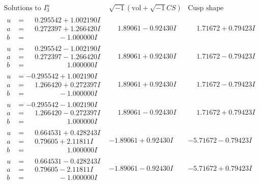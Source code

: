 \documentclass[1p]{elsarticle_modified}
\theoremstyle{definition}
\newcommand{\I}{\sqrt{-1}}
\begin{document}
$$\begin{array}{c|c|c}  
\text{Solutions to }I^u_{3}& \I (\text{vol} + \sqrt{-1}CS) & \text{Cusp shape}\\
 \hline 
\begin{aligned}
u &= \phantom{-}0.295542 + 1.002190 I \\
a &= \phantom{-}0.272397 + 1.266420 I \\
b &= \phantom{-0.000000 } -1.000000 I\end{aligned}
 & \phantom{-}1.89061 - 0.92430 I & \phantom{-}1.71672 + 0.79423 I \\ \hline\begin{aligned}
u &= \phantom{-}0.295542 - 1.002190 I \\
a &= \phantom{-}0.272397 - 1.266420 I \\
b &= \phantom{-0.000000 -}1.000000 I\end{aligned}
 & \phantom{-}1.89061 + 0.92430 I & \phantom{-}1.71672 - 0.79423 I \\ \hline\begin{aligned}
u &= -0.295542 + 1.002190 I \\
a &= \phantom{-}1.266420 + 0.272397 I \\
b &= \phantom{-0.000000 } -1.000000 I\end{aligned}
 & \phantom{-}1.89061 + 0.92430 I & \phantom{-}1.71672 - 0.79423 I \\ \hline\begin{aligned}
u &= -0.295542 - 1.002190 I \\
a &= \phantom{-}1.266420 - 0.272397 I \\
b &= \phantom{-0.000000 -}1.000000 I\end{aligned}
 & \phantom{-}1.89061 - 0.92430 I & \phantom{-}1.71672 + 0.79423 I \\ \hline\begin{aligned}
u &= \phantom{-}0.664531 + 0.428243 I \\
a &= \phantom{-}0.79605 + 2.11811 I \\
b &= \phantom{-0.000000 -}1.000000 I\end{aligned}
 & -1.89061 + 0.92430 I & -5.71672 - 0.79423 I \\ \hline\begin{aligned}
u &= \phantom{-}0.664531 - 0.428243 I \\
a &= \phantom{-}0.79605 - 2.11811 I \\
b &= \phantom{-0.000000 } -1.000000 I\end{aligned}
 & -1.89061 - 0.92430 I & -5.71672 + 0.79423 I \\ \hline\begin{aligned}

\end{aligned}
\end{array}$$
\end{document}
